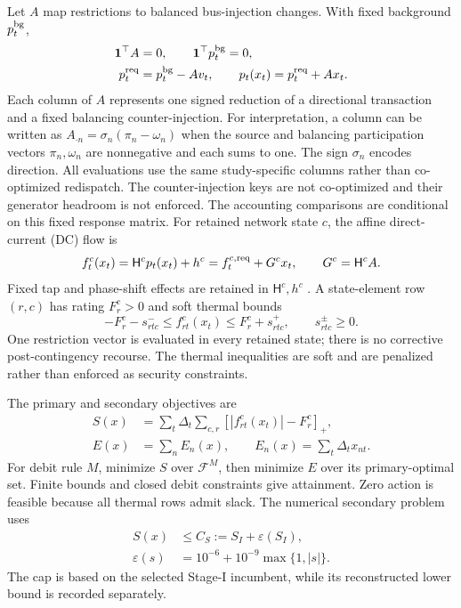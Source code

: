 \documentclass[10pt,journal]{IEEEtran}
\newcommand{\one}{\mathbf 1}
\newcommand{\pos}[1]{\left[#1\right]_+}
\newcommand{\F}{\mathcal F}
\begin{document}
Let $A$ map restrictions to balanced bus-injection changes. With fixed background $p_t^{\rm bg}$,
\begin{align}
\one^\top A&=0,\qquad \one^\top p_t^{\rm bg}=0,\notag\\
p_t^{\rm req}&=p_t^{\rm bg}-Av_t,\qquad p_t(x_t)=p_t^{\rm req}+Ax_t.
\label{eq:balance}
\end{align}
Each column of $A$ represents one signed reduction of a directional transaction and a fixed balancing counter-injection. For interpretation, a column can be written as $A_{\cdot n}=\sigma_n(\pi_n-\omega_n)$ when the source and balancing participation vectors $\pi_n,\omega_n$ are nonnegative and each sums to one. The sign $\sigma_n$ encodes direction. All evaluations use the same study-specific columns rather than co-optimized redispatch. The counter-injection keys are not co-optimized and their generator headroom is not enforced. The accounting comparisons are conditional on this fixed response matrix. For retained network state $c$, the affine direct-current (DC) flow is
\begin{equation}
f_t^c(x_t)=\mathsf H^cp_t(x_t)+h^c
=f_t^{c,\rm req}+G^cx_t,\qquad G^c=\mathsf H^cA.
\label{eq:flows}
\end{equation}
Fixed tap and phase-shift effects are retained in $\mathsf H^c,h^c$ \cite{Stott2009}. A state-element row $(r,c)$ has rating $F_r^c>0$ and soft thermal bounds
\begin{equation}
-F_r^c-s^-_{rtc}\leq f_{rt}^c(x_t)\leq F_r^c+s^+_{rtc},
\qquad s^\pm_{rtc}\geq0.
\label{eq:thermal}
\end{equation}
One restriction vector is evaluated in every retained state; there is no corrective post-contingency recourse. The thermal inequalities are soft and are penalized rather than enforced as security constraints.

The primary and secondary objectives are
\begin{align}
S(x)&=\sum_t\Delta_t\sum_{c,r}\pos{|f_{rt}^c(x_t)|-F_r^c},\label{eq:S}\\
E(x)&=\sum_n E_n(x),\qquad E_n(x)=\sum_t\Delta_tx_{nt}.
\label{eq:E}
\end{align}
For debit rule $M$, minimize $S$ over $\F^M$, then minimize $E$ over its primary-optimal set. Finite bounds and closed debit constraints give attainment. Zero action is feasible because all thermal rows admit slack. The numerical secondary problem uses
\begin{equation}
\begin{aligned}
S(x)&\leq C_S:=S_I+\varepsilon(S_I),\\
\varepsilon(s)&=10^{-6}+10^{-9}\max\{1,|s|\}.
\end{aligned}
\label{eq:cap}
\end{equation}
The cap is based on the selected Stage-I incumbent, while its reconstructed lower bound is recorded separately.
\end{document}
